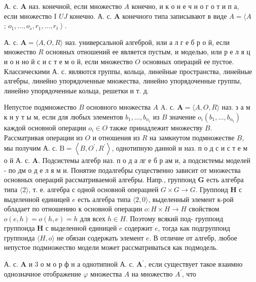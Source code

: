 \documentclass[10pt]{article}
\begin{document}
А. с. $\boldsymbol{A}$ наз. конечной, если множество $A$ конечно, и к о н е ч н о г о т и п а, если множество I $U J$ конечно. А. с. $\boldsymbol{A}$ конечного типа записывают в виде $A=\langle A$; $\left.o_{1}, \ldots, o_{s}, r_{1}, \ldots, r_{t}\right\rangle$.



А. с. $\boldsymbol{A}=\langle A, O, R\rangle$ наз. универсальной алгеброй, или а л г е б р о й, если множество $R$ основных отношений ее является пустым, и моделью, или р е л я ц и о н но й с и с т е м о й, если множество $O$ основных операций ее пустое. Классическими А. с. являются группы, кольца, линейные пространства, линейные алгебры, линейно упорядоченные множества, линейно упорядоченные группы, линейно упорядоченные кольца, решетки и т. д.



Непустое подмножество $B$ основного множества $A$ A. с. $\boldsymbol{A}=\langle A, O, R\rangle$ наз. з а м к н у т ы м, если для любых элементов $b_{1}, \ldots, b_{n_{i}}$ из $B$ значение $o_{i}\left(b_{1}, \ldots, b_{n_{i}}\right)$ каждой основной операции $o_{i} \in O$ также принадлежит множеству $B$. Рассматривая операции из $O$ и отношения из $R$ на замкнутом подмножестве $B$, мы получим А. с. $\mathrm{B}=\left\langle B, O^{\prime}, R^{\prime}\right\rangle$, однотипную данной и наз. п о д с и с т е м о й А. с. $\boldsymbol{A}$. Подсистемы алгебр наз. п о д а лг е б р ам и, а подсистемы моделей - по дм о д е л я м и. Понятие подалгебры существенно зависит от множества основных операций рассматриваемой алгебры. Напр., группоид $\boldsymbol{G}$ есть алгебра типа $\langle 2\rangle$, т. е. алгебра с одной основной операцией $G \times G \rightarrow G$. Группоид $\boldsymbol{H}$ с выделенной единицей $e$ есть алгебра типа $\langle 2,0\rangle$, выделенный элемент к-рой обладает по отношению к основной операции $o: H \times H \rightarrow H$ свойством $o(e, h)=o(h, e)=h$ для всех $h \in H$. Поэтому всякий под- группоид группоида $\boldsymbol{H}$ с выделенной единицей $e$ содержит $e$, тогда как подгруппоид группоида $\langle H, o\rangle$ не обязан содержать элемент $e$. В отличие от алгебр, любое непустое подмножество модели может рассматриваться как подмодель.



А. с. $\boldsymbol{A}$ и 3 о м о р ф н а однотипной А. с. $\boldsymbol{A}^{\prime}$, если существует такое взаимно однозначное отображение $\varphi$ множества $A$ на множество $A^{\prime}$, что
\end{document}
